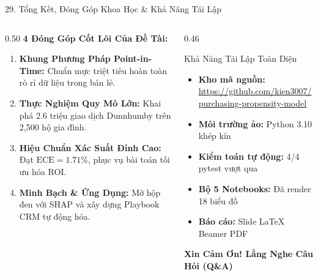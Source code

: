 \documentclass[aspectratio=169, 10pt]{beamer}
\begin{document}
\begin{frame}{29. Tổng Kết, Đóng Góp Khoa Học \& Khả Năng Tái Lập}
  \begin{columns}[T]
    \begin{column}{0.50\textwidth}
      \textbf{4 Đóng Góp Cốt Lõi Của Đề Tài:}
      \begin{enumerate}\setlength{\itemsep}{3pt}
        \item \textbf{Khung Phương Pháp Point-in-Time:} Chuẩn mực triệt tiêu hoàn toàn rò rỉ dữ liệu trong bán lẻ.
        \item \textbf{Thực Nghiệm Quy Mô Lớn:} Khai phá 2.6 triệu giao dịch Dunnhumby trên 2,500 hộ gia đình.
        \item \textbf{Hiệu Chuẩn Xác Suất Đỉnh Cao:} Đạt $\text{ECE} = 1.71\%$, phục vụ bài toán tối ưu hóa ROI.
        \item \textbf{Minh Bạch \& Ứng Dụng:} Mở hộp đen với SHAP và xây dựng Playbook CRM tự động hóa.
      \end{enumerate}
    \end{column}
    \begin{column}{0.46\textwidth}
      \begin{block}{Khả Năng Tái Lập Toàn Diện}
        \begin{itemize}\setlength{\itemsep}{2pt}
          \item \textbf{Kho mã nguồn:} \url{https://github.com/kien3007/purchasing-propensity-model}
          \item \textbf{Môi trường ảo:} Python 3.10 khép kín
          \item \textbf{Kiểm toán tự động:} 4/4 pytest vượt qua
          \item \textbf{Bộ 5 Notebooks:} Đã render 18 biểu đồ
          \item \textbf{Báo cáo:} Slide LaTeX Beamer PDF
        \end{itemize}
      \end{block}
      \vspace{0.2cm}
      \centering
      \textbf{\large Xin Cảm Ơn! Lắng Nghe Câu Hỏi (Q\&A)}
    \end{column}
  \end{columns}
\end{frame}
\end{document}
